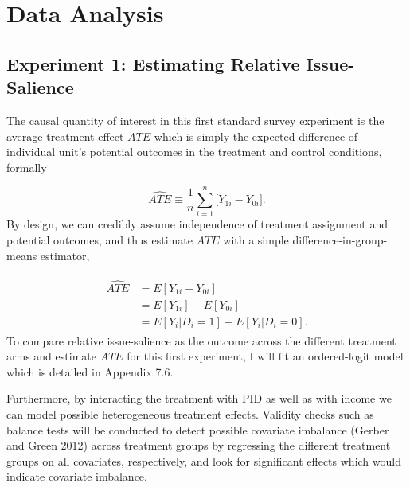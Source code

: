 \documentclass[11pt]{article}
\begin{document}
\newpage
\section{Data Analysis} \label{sec:sec5}
\subsection{Experiment 1: Estimating Relative Issue-Salience}
The causal quantity of interest in this first standard survey experiment is the average treatment effect $ATE$ which is simply the expected difference of individual unit's potential outcomes in the treatment and control conditions, formally

\begin{equation}
\widehat{ATE} \equiv \frac{1}{n} \sum_{i=1}^{n} \big[Y_{1i} - Y_{0i}\big].
\end{equation}
By design, we can credibly assume independence of treatment assignment and potential outcomes, and thus estimate $ATE$ with a simple difference-in-group-means estimator,

\begin{align}
\begin{split}
\widehat{ATE} & = E[Y_{1i} - Y_{0i}] \\
& = E[Y_{1i}] - E[Y_{0i}] \\
& = E[Y_i|D_i = 1] - E[Y_i|D_i = 0].
\end{split}
\end{align}
To compare relative issue-salience as the outcome across the different treatment arms and estimate $ATE$ for this first experiment, I will fit an ordered-logit model which is detailed in Appendix 7.6.

Furthermore, by interacting the treatment with PID as well as with income we can model possible heterogeneous treatment effects. Validity checks such as balance tests will be conducted to detect possible covariate imbalance (Gerber and Green 2012) across treatment groups by regressing the different treatment groups on all covariates, respectively, and look for significant effects which would indicate covariate imbalance.
\end{document}

